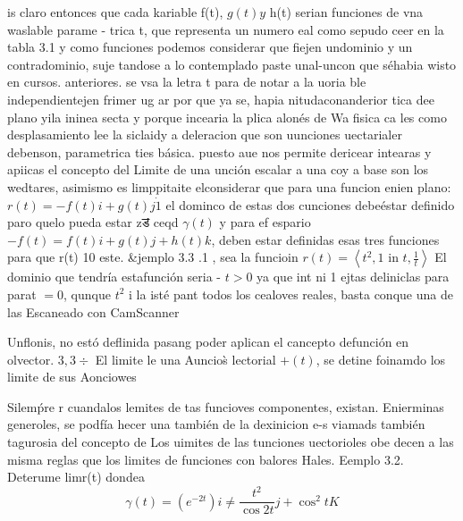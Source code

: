 is claro entonces que cada kariable f(t), $g(t) y$ h(t) serian funciones de vna waslable parame - trica t, que representa un numero eal como sepudo ceer en la tabla 3.1 y como funciones podemos considerar que fiejen undominio y un contradominio, suje tandose a lo contemplado paste unal-uncon que séhabia wisto en cursos. anteriores. se vsa la letra t para de notar a la uoria ble independientejen frimer ug ar por que ya se, hapia nitudaconanderior tica dee plano yila ininea secta y porque incearia la plica alonés de Wa fisica ca les como desplasamiento lee la siclaidy a deleracion que son uunciones uectarialer debenson, parametrica ties básica. puesto aue nos permite dericear intearas y apiicas el concepto del Limite de una unción escalar a una coy a base son los wedtares, asimismo es limppitaite elconsiderar que para una funcion enien plano: $r(t)=-f(t) i+g(t) j \dot{1}$ el dominco de estas dos cunciones debeéstar definido paro quelo pueda estar zड́ ceqd $\gamma(t)$ y para ef espario $-f(t)=f(t) i+g(t) j+h(t) k$, deben estar definidas esas tres funciones para que r(t) 10 este.
\&jemplo 3.3 .1 , sea la funcioin $r(t)=\left\langle t^2, 1\right.$ in $\left.t, \frac{1}{t}\right\rangle$ El dominio que tendría estafunción seria
- $t>0$ ya que int ni 1 ejtas deliniclas para parat $=0$, qunque $t^2$ i la isté pant todos los cealoves reales, basta conque una de las
Escaneado con CamScanner




Unflonis, no estó deflinida pasang poder aplican el cancepto defunción en olvector.
$3,3 \div$
El limite le una Auncios̀ lectorial $+(t)$, se detine foinamdo los limite de sus Aonciowes

Silemṕre r cuandalos lemites de tas funcioves componentes, existan.
Enierminas generoles, se podfía hecer una también de la dexinicion e-s viamads también tagurosia del concepto de
Los uimites de las tunciones uectorioles obe decen a las misma
reglas que los limites de funciones con balores Hales. Eemplo 3.2. Deterume limr(t) dondea
$$
\gamma(t)=\left(e^{-2 t}\right) i \neq \frac{t^2}{\cos 2 t} j+\cos ^2 t K
$$

